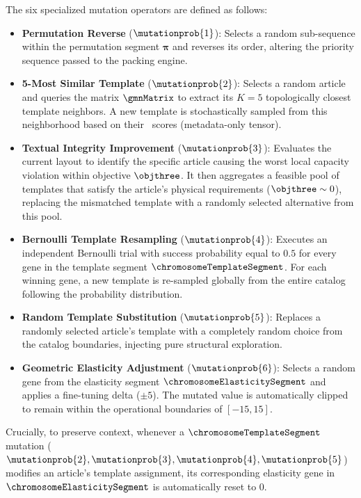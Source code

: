 The six specialized mutation operators are defined as follows:

\begin{itemize}
    \item \textbf{Permutation Reverse} ($\mutationprob{1}$): Selects a random sub-sequence within the permutation segment $\boldsymbol{\pi}$ and reverses its order, altering the priority sequence passed to the packing engine.
    \item \textbf{5-Most Similar Template} ($\mutationprob{2}$): Selects a random article and queries the matrix $\gmnMatrix$ to extract its $K=5$ topologically closest template neighbors. A new template is stochastically sampled from this neighborhood based on their  \neuralmethod\ scores (metadata-only tensor).
    \item \textbf{Textual Integrity Improvement} ($\mutationprob{3}$): Evaluates the current layout to identify the specific article causing the worst local capacity violation within objective $\objthree$. It then aggregates a feasible pool of templates that satisfy the article's physical requirements ($\objthree \sim 0$), replacing the mismatched template with a randomly selected  alternative from this pool.
    \item \textbf{Bernoulli Template Resampling} ($\mutationprob{4}$): Executes an independent Bernoulli trial with success probability equal to $0.5$ for every gene in the template segment $\chromosomeTemplateSegment$. For each winning gene, a new template is re-sampled globally from the entire catalog following the \neuralmethod probability distribution.
    \item \textbf{Random Template Substitution} ($\mutationprob{5}$): Replaces a randomly selected article's template with a completely random choice from the catalog boundaries, injecting pure structural exploration.
    \item \textbf{Geometric Elasticity Adjustment} ($\mutationprob{6}$): Selects a random gene from the elasticity segment $\chromosomeElasticitySegment$ and applies a fine-tuning delta ($\pm 5$). The mutated value is automatically clipped to remain within the operational boundaries of $[-15, 15]$.
\end{itemize}

Crucially, to preserve context, whenever a $\chromosomeTemplateSegment$ mutation ($\mutationprob{2}, \mutationprob{3}, \mutationprob{4}, \mutationprob{5}$) modifies an article's template assignment, its corresponding elasticity gene in $\chromosomeElasticitySegment$ is automatically reset to 0.


